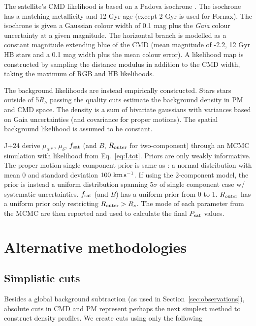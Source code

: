 The satellite's CMD likelihood is based on a Padova isochrone
\citep{girardi+2002}. The isochrone has a matching metallicity and 12
Gyr age (except 2 Gyr is used for Fornax). The isochrone is given a
Gaussian colour width of 0.1 mag plus the \emph{Gaia} colour uncertainty
at a given magnitude. The horizontal branch is modelled as a constant
magnitude extending blue of the CMD (mean magnitude of -2.2, 12 Gyr HB
stars and a 0.1 mag width plus the mean colour error). A likelihood map
is constructed by sampling the distance modulus in addition to the CMD
width, taking the maximum of RGB and HB likelihoods.

The background likelihoods are instead empirically constructed. Stars
stars outside of 5\(R_h\) passing the quality cuts estimate the
background density in PM and CMD space. The density is a sum of
bivariate gaussians with variances based on Gaia uncertainties (and
covariance for proper motions). The spatial background likelihood is
assumed to be constant.

J+24 derive \(\mu_{\alpha*}\), \(\mu_\delta\), \(f_{\rm sat}\) (and
\(B\), \(R_{\rm outer}\) for two-component) through an MCMC simulation
with likelihood from Eq.~\ref{eq:Ltot}. Priors are only weakly
informative. The proper motion single component prior is same as
\citet{MV2020a}: a normal distribution with mean 0 and standard
deviation \(100\ {\rm km\,s^{-1}}\). If using the 2-component model, the prior is
instead a uniform distribution spanning 5\(\sigma\) of single component
case w/ systematic uncertainties. \(f_{\rm sat}\) (and \(B\)) has a
uniform prior from 0 to 1. \(R_{\rm outer}\) has a uniform prior only
restricting \(R_{\rm outer} > R_s\). The mode of each parameter from the
MCMC are then reported and used to calculate the final \(P_{\rm sat}\)
values.

\section{Alternative methodologies}\label{alternative-methodologies}

\subsection{Simplistic cuts}\label{simplistic-cuts}

Besides a global background subtraction (as used in
Section~\ref{sec:observations}), absolute cuts in CMD and PM represent
perhaps the next simplest method to construct density profiles. We
create cuts using only the following

